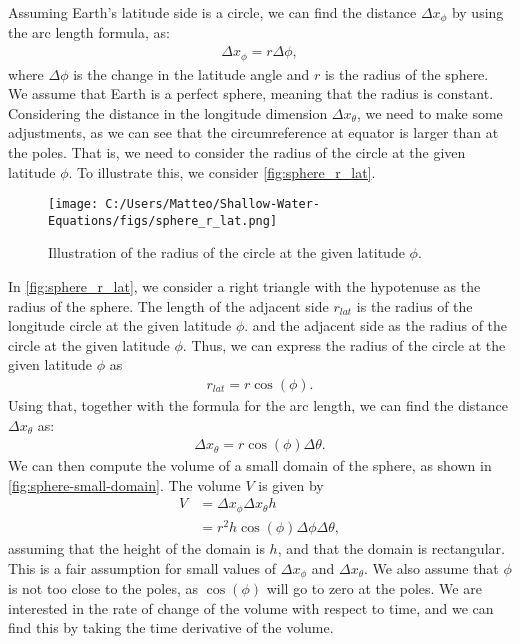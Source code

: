 Assuming Earth's latitude side is a circle, we can find the distance $\Delta x_{\phi}$ by using the arc length formula, as:
\begin{align*}
    \Delta x_{\phi} = r \Delta \phi,
\end{align*}
where $\Delta \phi$ is the change in the latitude angle and $r$ is the radius of the sphere.
We assume that Earth is a perfect sphere, meaning that the radius is constant.
Considering the distance in the longitude dimension $\Delta x_{\theta}$, we need to make some adjustments, as we can see that the circumreference at equator is larger than at the poles.
That is, we need to consider the radius of the circle at the given latitude $\phi$.
To illustrate this, we consider \autoref{fig:sphere_r_lat}.
\begin{figure}[H]
    \centering
    \texttt{[image: C:/Users/Matteo/Shallow-Water-Equations/figs/sphere\_r\_lat.png]}
    \caption{Illustration of the radius of the circle at the given latitude $\phi$.}\label{fig:sphere_r_lat}
\end{figure}
In \autoref{fig:sphere_r_lat}, we consider a right triangle with the hypotenuse as the radius of the sphere.
The length of the adjacent side $r_{lat}$ is the radius of the longitude circle at the given latitude $\phi$.
and the adjacent side as the radius of the circle at the given latitude $\phi$.
Thus, we can express the radius of the circle at the given latitude $\phi$ as
\begin{align*}
    r_{lat} = r \cos(\phi).  
\end{align*}
Using that, together with the formula for the arc length, we can find the distance $\Delta x_{\theta}$ as:
\begin{align*}
    \Delta x_{\theta} = r \cos(\phi) \Delta \theta.
\end{align*}
We can then compute the volume of a small domain of the sphere, as shown in \autoref{fig:sphere-small-domain}.
The volume $V$ is given by 
\begin{align*}
    V &= \Delta x_{\phi} \Delta x_{\theta} h \\
    &= r^2 h \cos(\phi) \Delta \phi \Delta \theta,
\end{align*}
assuming that the height of the domain is $h$, and that the domain is rectangular.
This is a fair assumption for small values of $\Delta x_{\phi}$ and $\Delta x_{\theta}$.
We also assume that $\phi$ is not too close to the poles, as $\cos(\phi)$ will go to zero at the poles.
We are interested in the rate of change of the volume with respect to time, and we can find this by taking the time derivative of the volume.

